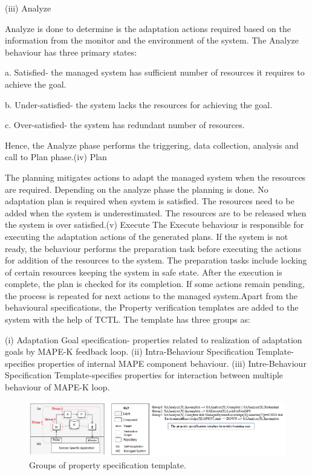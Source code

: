 \begin{compactitem}
(iii) Analyze

Analyze is done to determine is the adaptation actions required based on the information from the monitor and the environment of the system. The Analyze behaviour has three 
primary states: 

a. Satisfied- the managed system has sufficient number of resources it requires to achieve the goal. 

b. Under-satisfied- the system lacks the resources for achieving the goal.

c. Over-satisfied- the system has redundant number of resources.

Hence, the Analyze phase performs the triggering, data collection, analysis and call to Plan phase.(iv) Plan

The planning mitigates actions to adapt the managed system when the resources are required. Depending on the analyze phase the planning is done. No adaptation plan is required when system is satisfied. The resources need to be added when the system is underestimated. The resources are to be released when the system is over satisfied.(v) Execute
The Execute behaviour is responsible for executing the adaptation actions of the generated plans. If the system is not ready, the behaviour performs the preparation task 
before executing the actions for addition of the resources to the system. The preparation tasks include locking of certain resources keeping the system in safe state. After the execution is complete, the plan is checked for its completion. If some actions remain pending, the process is repeated for next actions to the managed system.Apart from the behavioural specifications, the Property verification templates are added to the system with the help of TCTL. The template has three groups as:

(i) Adaptation Goal specification- properties related to realization of adaptation goals by MAPE-K feedback loop. (ii) Intra-Behaviour Specification Template-specifies properties of internal MAPE component behaviour. (iii) Intre-Behaviour Specification Template-specifies properties for interaction between multiple behaviour of MAPE-K loop.

\begin{figure}[H]
\center
\includegraphics[width=5in]{img/pst}
\caption{Groups of property specification template.}
\end{figure}


\end{compactitem}
